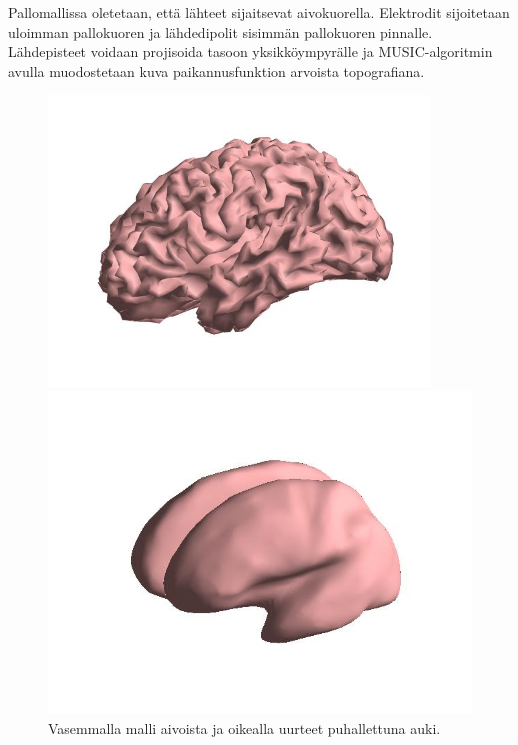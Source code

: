 Pallomallissa oletetaan, että lähteet sijaitsevat aivokuorella. Elektrodit sijoitetaan uloimman pallokuoren ja lähdedipolit sisimmän pallokuoren pinnalle. Lähdepisteet voidaan projisoida tasoon yksikköympyrälle ja MUSIC-algoritmin avulla muodostetaan kuva paikannusfunktion arvoista topografiana.

\begin{figure}[ht]
    \begin{minipage}{0.5\textwidth}
        \centering
        \includegraphics[width=0.9\textwidth]{aivot2.jpg}
    \end{minipage}
    \begin{minipage}{0.5\textwidth}
        \centering
        \includegraphics[width=\textwidth]{aivot.jpg}
    \end{minipage}
    \caption{Vasemmalla malli aivoista ja oikealla uurteet puhallettuna auki.}
    \label{fig:esim}
\end{figure}

